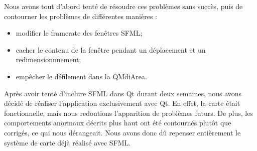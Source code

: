Nous avons tout d'abord tenté de résoudre ces problèmes sans succès, puis de contourner les problèmes de différentes manières :
\begin{itemize}
	\item modifier le framerate des fenêtres SFML;
	\item cacher le contenu de la fenêtre pendant un déplacement et un redimensionnnement;
	\item empêcher le défilement dans la QMdiArea.
\end{itemize}
 
Après avoir tenté d'inclure SFML dans Qt durant deux semaines, nous avons décidé de réaliser l'application exclusivement avec Qt. En effet, la carte était fonctionnelle, mais nous redoutions l'apparition de problèmes futurs. De plus, les comportements anormaux décrits plus haut ont été contournés plutôt que corrigés, ce qui nous dérangeait. Nous avons donc dû repenser entièrement le système de carte déjà réalisé avec SFML.